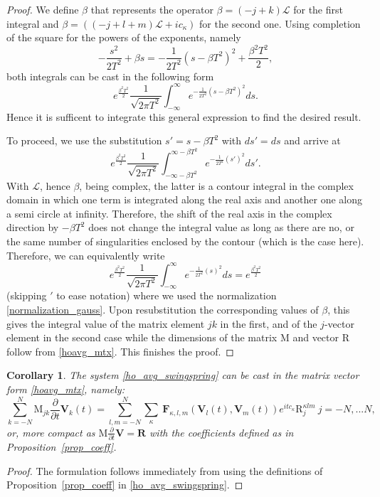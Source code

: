 \documentclass[a4,12pt]{article}
\newtheorem{corollary}[theorem]{Corollary}
\newcommand{\pp}[2]{\frac{\partial #1}{\partial #2}}
\newcommand{\V}{\mathbf{V}}
\newcommand{\M}{\mathrm{M}}
\newcommand{\R}{\mathrm{R}}
\newcommand{\Fu}{\mathbf{F}}
\newcommand{\opL}{\mathcal{L}}
\begin{document}
\begin{proof}
We define $\beta$ that represents the operator $\beta = (-j +k)\opL$ for the first integral and $\beta = ((-j + l + m)\opL + i c_\kappa)$ for the second one. Using completion of the square for the powers of the exponents, namely
\begin{equation}
 -\frac{s^2}{2T^2} + \beta s =     - \frac{1}{2T^2} (s - \beta T^2)^2 + \frac{\beta^2 T^2}{2},
\end{equation}
both integrals can be cast in the following form
 \begin{equation}\label{prop_eqn1}
  e^{\frac{\beta^2T^2}{2}}\frac{1}{\sqrt{2\pi T^2}}\int_{-\infty}^\infty
  e^{- \frac{1}{2T^2} (s - \beta T^2)^2} ds.
 \end{equation}
Hence it is sufficent to integrate this general expression to find the desired result.

To proceed, we use the substitution $s' = s - \beta T^2$ with $ds' = ds$ and arrive at
 \begin{equation}\label{prop_eqn2}
  e^{\frac{\beta^2T^2}{2}}\frac{1}{\sqrt{2\pi T^2}}\int_{-\infty-\beta T^2}^{\infty-\beta T^2}
  e^{- \frac{1}{2T^2} (s')^2} ds'.
 \end{equation}
With $\opL$, hence $\beta$, being complex, the latter is a contour integral in the complex domain in which one term is integrated along the real axis and another one along a semi circle at infinity. Therefore, the shift of the real axis in the complex direction by $- \beta  T^2$
 does not change the integral value as long as there are no, or the same number of singularities
 enclosed by the contour (which is the case here).
 Therefore, we can equivalently write
\begin{equation}\label{prop_eqn3}
  e^{\frac{\beta^2T^2}{2}}\frac{1}{\sqrt{2\pi T^2}}\int_{-\infty}^{\infty}
  e^{- \frac{1}{2T^2} (s)^2} ds = e^{\frac{\beta^2T^2}{2}}
 \end{equation}
(skipping $'$ to ease notation) where we used the normalization \eqref{normalization_gauss}.
Upon resubstitution the corresponding values of $\beta$, this gives the integral value of the matrix element $jk$ in the first, and of the $j$-vector element in the second case while the dimensions of the matrix $\M$ and vector $ \R$ follow from \eqref{hoavg_mtx}. This finishes the proof.
\end{proof}


\begin{corollary}
The system \eqref{ho_avg_swingspring} can be cast in the matrix vector form \eqref{hoavg_mtx}, namely:
\begin{equation}\label{swingspring_mtx}
{\sum_{k=-N}^{N} }
\M_{jk} \pp{}{t}  \V_{k}(t) =
\sum_{l,m = -N}^N  \sum_{\kappa} \ \Fu_{\kappa,l, m}(\V_l(t),\V_m(t)) e^{i {t c_\kappa} }
\R_{j}^{\kappa lm}
\ {j = -N,...N},
\end{equation}
or, more compact as $\M \pp{}{t}  \V = \mathbf{R}$ with the coefficients defined as in Proposition~\ref{prop_coeff}.
\end{corollary}
\begin{proof}
 The formulation follows immediately from using the definitions of Proposition~\ref{prop_coeff}
 in \eqref{ho_avg_swingspring}.
\end{proof}
\end{document}
